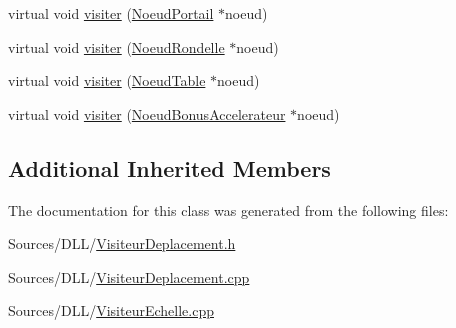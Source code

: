 \begin{DoxyCompactItemize}
virtual void \hyperlink{group__inf2990_ga27370e2a2e188d7d209e20e4e8228f42}{visiter} (\hyperlink{class_noeud_portail}{Noeud\+Portail} $\ast$noeud)
\item 
virtual void \hyperlink{group__inf2990_ga9b1dde6c8d6e7dab86ffa64925b62edd}{visiter} (\hyperlink{class_noeud_rondelle}{Noeud\+Rondelle} $\ast$noeud)
\item 
virtual void \hyperlink{group__inf2990_ga9599fc0f1de752c95febe9315eefc808}{visiter} (\hyperlink{class_noeud_table}{Noeud\+Table} $\ast$noeud)
\item 
virtual void \hyperlink{group__inf2990_gaa214ddf720db2c3969d3bde0e5e1ce3a}{visiter} (\hyperlink{class_noeud_bonus_accelerateur}{Noeud\+Bonus\+Accelerateur} $\ast$noeud)
\end{DoxyCompactItemize}
\subsection*{Additional Inherited Members}


The documentation for this class was generated from the following files\+:\begin{DoxyCompactItemize}
\item 
Sources/\+D\+L\+L/\hyperlink{_visiteur_deplacement_8h}{Visiteur\+Deplacement.\+h}\item 
Sources/\+D\+L\+L/\hyperlink{_visiteur_deplacement_8cpp}{Visiteur\+Deplacement.\+cpp}\item 
Sources/\+D\+L\+L/\hyperlink{_visiteur_echelle_8cpp}{Visiteur\+Echelle.\+cpp}\end{DoxyCompactItemize}
